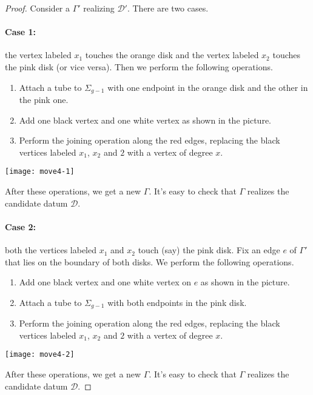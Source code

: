 \documentclass{article}
\begin{document}
\begin{proof}
Consider a \dessin{} $\Gamma'$ realizing $\mathcal{D}'$. There are two cases.
\paragraph{Case 1:} the vertex labeled $x_1$ touches the orange disk and the vertex labeled $x_2$ touches the pink disk (or vice versa). Then we perform the following operations.
\begin{enumerate}
\item Attach a tube to $\Sigma_{g-1}$ with one endpoint in the orange disk and the other in the pink one.
\item Add one black vertex and one white vertex as shown in the picture.
\item Perform the joining operation along the red edges, replacing the black vertices labeled $x_1$, $x_2$ and $2$ with a vertex of degree $x$.
\end{enumerate}
\begin{center}
\texttt{[image: move4-1]}
\end{center}
After these operations, we get a new \dessin{} $\Gamma$. It's easy to check that $\Gamma$ realizes the candidate datum $\mathcal{D}$.
\paragraph{Case 2:} both the vertices labeled $x_1$ and $x_2$ touch (say) the pink disk. Fix an edge $e$ of $\Gamma'$ that lies on the boundary of both disks. We perform the following operations.
\begin{enumerate}
\item Add one black vertex and one white vertex on $e$ as shown in the picture.
\item Attach a tube to $\Sigma_{g-1}$ with both endpoints in the pink disk.
\item Perform the joining operation along the red edges, replacing the black vertices labeled $x_1$, $x_2$ and $2$ with a vertex of degree $x$.
\end{enumerate}
\begin{center}
\texttt{[image: move4-2]}
\end{center}
After these operations, we get a new \dessin{} $\Gamma$. It's easy to check that $\Gamma$ realizes the candidate datum $\mathcal{D}$.
\end{proof}
\end{document}

